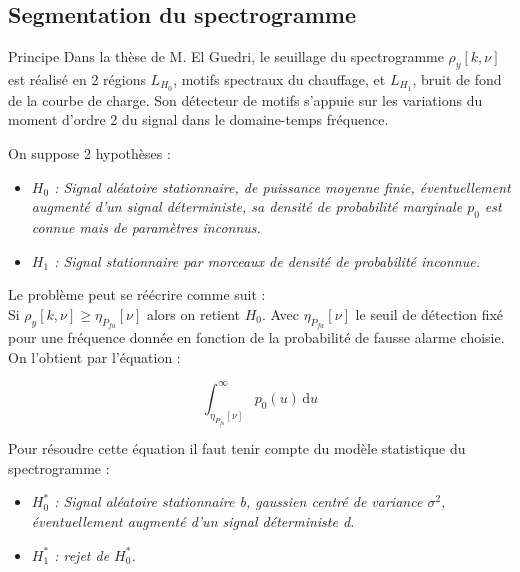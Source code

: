 \documentclass{beamer}
\begin{document}
\subsection{Segmentation du spectrogramme}
\begin{frame}{Principe}
Dans la thèse de M. El Guedri, le seuillage du spectrogramme $\rho_y[k,\nu]$ est réalisé en 2 régions $L_{H_0}$, motifs spectraux du chauffage, et $L_{H_1}$, bruit de fond de la courbe de charge. Son détecteur de motifs s'appuie sur les variations du moment d'ordre 2 du signal dans le domaine-temps fréquence.

On suppose 2 hypothèses :
\begin{itemize}
	\item \textit{$H_0$ : Signal aléatoire stationnaire, de puissance moyenne finie, éventuellement augmenté d'un signal déterministe, sa densité de probabilité marginale $p_0$ est connue mais de paramètres inconnus.}
	\item \textit{$H_1$ : Signal stationnaire par morceaux de densité de probabilité inconnue.}
\end{itemize}
\end{frame}

\begin{frame}
Le problème peut se réécrire comme suit : \\
Si $\rho_y[k,\nu] \ge \eta_{P_{fa}}[\nu]$ alors on retient $H_0$.
Avec $\eta_{P_{fa}}[\nu]$ le seuil de détection fixé pour une fréquence donnée en fonction de la probabilité de fausse alarme choisie. \\
On l'obtient par l'équation :

\begin{equation}
\int_{\eta_{P_{fa}}[\nu]}^\infty p_0(u)\, \mathrm du
\label{eq1}
\end{equation}

Pour résoudre cette équation il faut tenir compte du modèle statistique du spectrogramme :
\begin{itemize}
	\item \textit{$H_0^*$ : Signal aléatoire stationnaire b, gaussien centré de variance $\sigma^2$, éventuellement augmenté d'un signal déterministe d.}
	\item \textit{$H_1^*$ : rejet de $H_0^*$.}
\end{itemize}
\end{frame}
\end{document}
